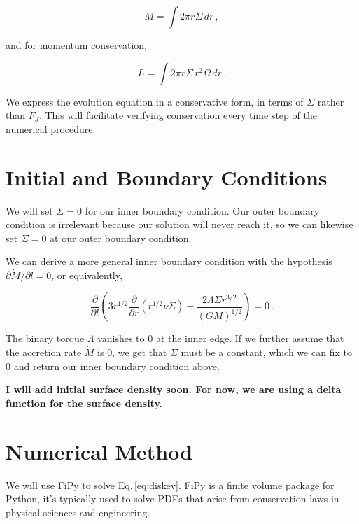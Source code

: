 \documentclass{article}
\begin{document}
\begin{equation}
M = \int 2\pi r \Sigma\, dr\,,
\end{equation}

and for momentum conservation,

\begin{equation}
\textit{L} = \int2\pi r \Sigma\, r^2 \Omega\, dr\,.
\end{equation}

We express the evolution equation in a conservative form, in terms of $\Sigma$ rather than $F_J$. This will facilitate verifying conservation every time step of the numerical procedure.

\section{Initial and Boundary Conditions}

We will set $\Sigma = 0$ for our inner boundary condition. Our outer boundary condition is irrelevant because our solution will never reach it, so we can likewise set $\Sigma = 0$ at our outer boundary condition. 

We can derive a more general inner boundary condition with the hypothesis $\partial \dot{M}/ \partial l = 0$, or equivalently,

\begin{equation}
\frac{\partial}{\partial l} \left(3 r^{1/2} \frac{\partial}{\partial r} \left(r^{1/2} \nu \Sigma\right) - \frac{2 \Lambda \Sigma r^{3/2}}{(G M)^{1/2}}\right)= 0\,.
\end{equation}

The binary torque $\Lambda$ vanishes to 0 at the inner edge. If we further assume that the accretion rate $\dot{M}$ is 0, we get that $\Sigma$ must be a constant, which we can fix to 0 and return our inner boundary condition above.

\textbf{I will add initial surface density soon. For now, we are using a delta function for the surface density.}

\section{Numerical Method}

We will use FiPy to solve Eq.\,\ref{eq:diskev}. FiPy is a finite volume package for Python, it's typically used to
solve PDEs that arise from conservation laws in physical sciences and engineering.
\end{document}
